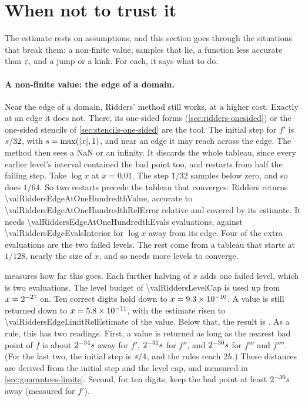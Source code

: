 \section{When not to trust it}\label{sec:ridders-trust}

The estimate rests on assumptions, and this section goes through the situations that break them: a non-finite
value, samples that lie, a function less accurate than $\varepsilon$, and a jump or a kink. For each, it says what to do.

\paragraph{A non-finite value: the edge of a domain.} Near the edge of a domain, Ridders' method still works, at a
higher cost. Exactly at an edge it does not. There, its one-sided forms (\cref{sec:ridders-onesided}) or the
one-sided stencils of \cref{sec:stencils-one-sided} are the tool. The initial step for $f'$ is $s / 32$, with
$s = \max(\lvert x \rvert, 1)$, and near an edge it may reach across the edge. The method then sees a NaN or an
infinity. It discards the whole tableau, since every earlier level's interval contained the bad point too, and
restarts from half the failing step. Take $\log x$ at $x = 0.01$. The step $1/32$ samples below zero, and so does
$1/64$. So two restarts precede the tableau that converges:
Ridders returns \num{\valRiddersEdgeAtOneHundredthValue}, accurate to \num{\valRiddersEdgeAtOneHundredthRelError}
relative and covered by its estimate. It needs \num{\valRiddersEdgeAtOneHundredthEvals} evaluations, against
\num{\valRiddersEdgeEvalsInterior} for $\log x$ away from its edge. Four of the extra evaluations are the two failed
levels. The rest come from a tableau that starts at $1/128$, nearly the size of $x$, and so needs more levels to
converge.

 measures how far this goes. Each further halving of $x$ adds one failed level, which is two
evaluations. The level budget of \num{\valRiddersLevelCap} is used up from
$x = 2^{-\num{27}}$ on. Ten correct digits hold down to $x = \num{9.3e-10}$.
A value is still returned down to $x = \num{5.8e-11}$, with the estimate risen to
\num{\valRiddersEdgeLimitRelEstimate} of the value. Below that, the result is . As a rule, this has
two readings. First, a value is returned as long as the nearest bad point of $f$ is about $2^{-34} s$ away for
$f'$, $2^{-31} s$ for $f''$, and $2^{-30} s$ for $f'''$ and $f''''$. (For the last two, the initial step is
$s / 4$, and the rules reach $2h$.) These distances are derived from the initial step and the level cap, and
measured in \cref{sec:guarantees-limits}. Second, for ten digits, keep the bad point at least
$2^{-\num{30}} s$ away (measured for $f'$).


